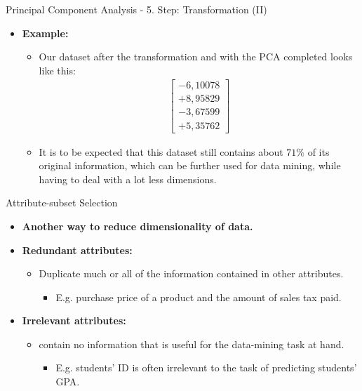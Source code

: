 \begin{frame}{Principal Component Analysis - 5. Step: Transformation (II)}
	\begin{itemize}
		\item \textbf{Example:}
		      \begin{itemize}
			      \item Our dataset after the transformation and with the PCA
			            completed looks like this: \\
			            \begin{align*}
				            \begin{bmatrix} -6,10078 \\ +8,95829 \\ -3,67599 \\ +5,35762
				            \end{bmatrix}
			            \end{align*}
			      \item It is to be expected that this dataset still contains about
			            $71\%$ of its original information, which can be
			            further used for data mining, while having to deal with
			            a lot less dimensions.
		      \end{itemize}
	\end{itemize}
\end{frame}

\begin{frame}{Attribute-subset Selection}
	\begin{itemize}
		\item \textbf{Another way to reduce dimensionality of data.}
		      \item\textbf{\color{airforceblue}Redundant attributes:}
		      \begin{itemize}
			      \item Duplicate much or all of the information contained in other
			            attributes.
			            \begin{itemize}
				            \item E.g. purchase price of a product and the amount of sales
				                  tax paid.
			            \end{itemize}
		      \end{itemize}
		\item \textbf{\color{airforceblue}Irrelevant attributes:}
		      \begin{itemize}
			      \item contain no information that is useful for the data-mining
			            task at hand.
			            \begin{itemize}
				            \item E.g. students' ID is often irrelevant to the task of
				                  predicting students' GPA.
			            \end{itemize}
		      \end{itemize}
	\end{itemize}
\end{frame}

